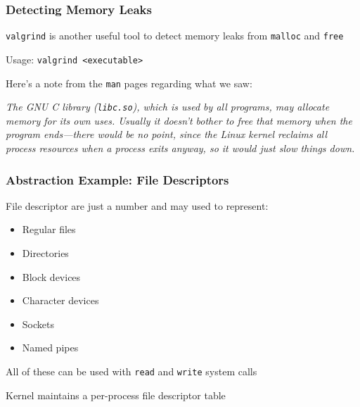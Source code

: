 \documentclass[aspectratio=169]{beamer}
\begin{document}
  \begin{frame}
    \frametitle{Detecting Memory Leaks}

    \texttt{valgrind} is another useful tool to detect memory leaks from
    \texttt{malloc} and \texttt{free}

    \hspace{1em} Usage: \texttt{valgrind <executable>}

    \vspace{1em}

    Here's a note from the \texttt{man} pages regarding what we saw:

    \textit{The GNU C library (\texttt{libc.so}), which is used by all programs,
      may allocate memory for its own uses. Usually it doesn't bother to free
      that memory when the program ends—there would be no point, since the Linux
      kernel reclaims all process resources when a process exits anyway, so it
      would just slow things down.}

    \vspace{1em}

  \end{frame}

  \begin{frame}
    \frametitle{Abstraction Example: File Descriptors}

    File descriptor are just a number and may used to represent:
    \begin{itemize}
      \item Regular files
      \item Directories
      \item Block devices
      \item Character devices
      \item Sockets
      \item Named pipes
    \end{itemize}

    All of these can be used with \texttt{read} and \texttt{write} system calls

    \vspace{1em}

    Kernel maintains a per-process file descriptor table
  \end{frame}
\end{document}
